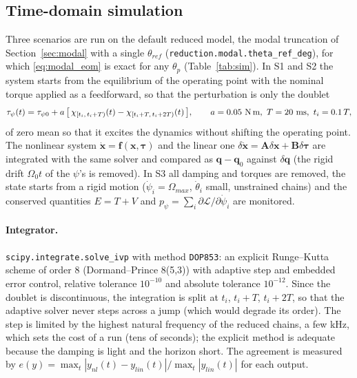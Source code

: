 \documentclass[10pt,a4paper]{article}
\numberwithin{equation}{section}
\begin{document}
\subsection{Time-domain simulation}
Three scenarios are run on the default reduced model, the modal truncation of Section~\ref{sec:modal} with a single $\theta_{ref}$ (\texttt{reduction.modal.theta\_ref\_deg}), for which \eqref{eq:modal_eom} is exact for any $\theta_p$ (Table~\ref{tab:sim}). In S1 and S2 the system starts from the equilibrium of the operating point with the nominal torque applied as a feedforward, so that the perturbation is only the doublet
\begin{gather}
\tau_\psi(t) = \tau_{\psi0} + a\,\bigl[\,\chi_{[t_i,\,t_i+T)}(t) - \chi_{[t_i+T,\,t_i+2T)}(t)\,\bigr],\qquad a = 0.05\ \text{N\,m},\ T = 20\ \text{ms},\ t_i = 0.1\,T,
\end{gather}
of zero mean so that it excites the dynamics without shifting the operating point. The nonlinear system $\dot{\mathbf x} = \mathbf f(\mathbf x,\boldsymbol\tau)$ and the linear one $\delta\dot{\mathbf x} = \mathbf A\delta\mathbf x + \mathbf B\delta\boldsymbol\tau$ are integrated with the same solver and compared as $\mathbf q - \mathbf q_0$ against $\delta\mathbf q$ (the rigid drift $\Omega_0 t$ of the $\psi$'s is removed). In S3 all damping and torques are removed, the state starts from a rigid motion ($\dot\psi_i = \Omega_{max}$, $\dot\theta_i$ small, unstrained chains) and the conserved quantities $E = T + V$ and $p_\psi = \sum_i\partial\mathcal L/\partial\dot\psi_i$ are monitored.
\paragraph{Integrator.} \texttt{scipy.integrate.solve\_ivp} with method \texttt{DOP853}: an explicit Runge--Kutta scheme of order 8 (Dormand--Prince 8(5,3)) with adaptive step and embedded error control, relative tolerance $10^{-10}$ and absolute tolerance $10^{-12}$. Since the doublet is discontinuous, the integration is split at $t_i$, $t_i+T$, $t_i+2T$, so that the adaptive solver never steps across a jump (which would degrade its order). The step is limited by the highest natural frequency of the reduced chains, a few kHz, which sets the cost of a run (tens of seconds); the explicit method is adequate because the damping is light and the horizon short. The agreement is measured by $e(y) = \max_t|y_{nl}(t) - y_{lin}(t)|/\max_t|y_{lin}(t)|$ for each output.
\end{document}
